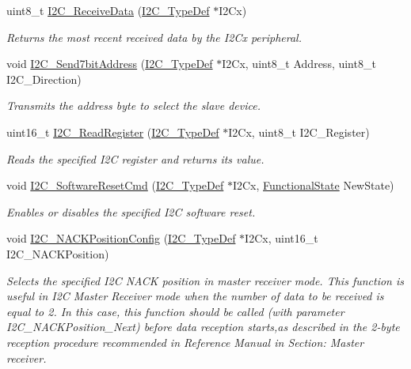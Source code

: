 \begin{DoxyCompactItemize}
uint8\+\_\+t \hyperlink{group___i2_c___private___functions_gaeaaa4b6f77f50eb57465148c55d27fb2}{I2\+C\+\_\+\+Receive\+Data} (\hyperlink{struct_i2_c___type_def}{I2\+C\+\_\+\+Type\+Def} $\ast$I2\+Cx)
\begin{DoxyCompactList}\small\item\em Returns the most recent received data by the I2\+Cx peripheral. \end{DoxyCompactList}\item 
void \hyperlink{group___i2_c___private___functions_ga009fc2a5b2313c36da39ece39a1156a6}{I2\+C\+\_\+\+Send7bit\+Address} (\hyperlink{struct_i2_c___type_def}{I2\+C\+\_\+\+Type\+Def} $\ast$I2\+Cx, uint8\+\_\+t Address, uint8\+\_\+t I2\+C\+\_\+\+Direction)
\begin{DoxyCompactList}\small\item\em Transmits the address byte to select the slave device. \end{DoxyCompactList}\item 
uint16\+\_\+t \hyperlink{group___i2_c___private___functions_ga8021dc796d15f997356b0583d6346805}{I2\+C\+\_\+\+Read\+Register} (\hyperlink{struct_i2_c___type_def}{I2\+C\+\_\+\+Type\+Def} $\ast$I2\+Cx, uint8\+\_\+t I2\+C\+\_\+\+Register)
\begin{DoxyCompactList}\small\item\em Reads the specified I2C register and returns its value. \end{DoxyCompactList}\item 
void \hyperlink{group___i2_c___private___functions_ga1289c908aeb882443aba323b459c638b}{I2\+C\+\_\+\+Software\+Reset\+Cmd} (\hyperlink{struct_i2_c___type_def}{I2\+C\+\_\+\+Type\+Def} $\ast$I2\+Cx, \hyperlink{group___exported__types_gac9a7e9a35d2513ec15c3b537aaa4fba1}{Functional\+State} New\+State)
\begin{DoxyCompactList}\small\item\em Enables or disables the specified I2C software reset. \end{DoxyCompactList}\item 
void \hyperlink{group___i2_c___private___functions_gad08ebffc3a234d84e6405ec115bd74f1}{I2\+C\+\_\+\+N\+A\+C\+K\+Position\+Config} (\hyperlink{struct_i2_c___type_def}{I2\+C\+\_\+\+Type\+Def} $\ast$I2\+Cx, uint16\+\_\+t I2\+C\+\_\+\+N\+A\+C\+K\+Position)
\begin{DoxyCompactList}\small\item\em Selects the specified I2C N\+A\+CK position in master receiver mode. This function is useful in I2C Master Receiver mode when the number of data to be received is equal to 2. In this case, this function should be called (with parameter I2\+C\+\_\+\+N\+A\+C\+K\+Position\+\_\+\+Next) before data reception starts,as described in the 2-\/byte reception procedure recommended in Reference Manual in Section\+: Master receiver. \end{DoxyCompactList}\item 

\end{DoxyCompactItemize}
